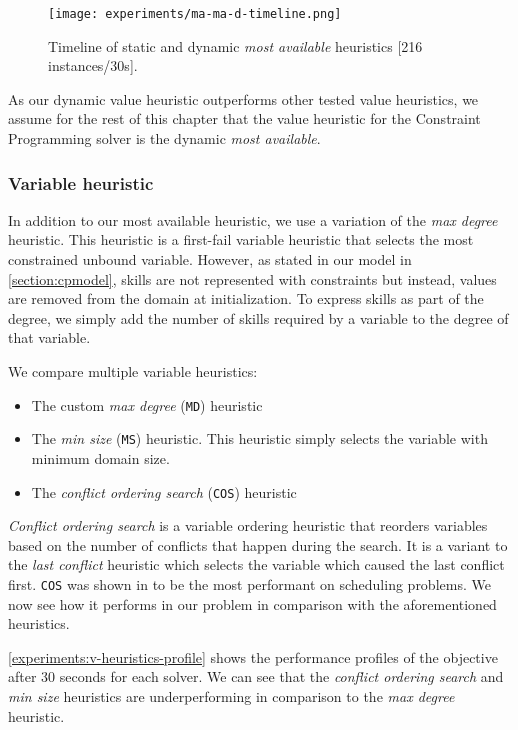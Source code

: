 \documentclass[../../thesis.tex]{subfiles}
\begin{document}
\begin{figure}
  \centering
  \texttt{[image: experiments/ma-ma-d-timeline.png]}
  \caption{Timeline of static and dynamic  \emph{most available} heuristics [216 instances/30s].}
  \label{experiments:ma-ma-d-timeline}
\end{figure}


\FloatBarrier

As our dynamic value heuristic outperforms other tested value heuristics, we assume for the rest of this chapter 
that the value heuristic for the Constraint Programming solver is the dynamic  \emph{most available}.


\subsubsection{Variable heuristic}

In addition to our most available heuristic, we use a variation of the  \emph{max degree} heuristic. 
This heuristic is a first-fail variable heuristic that selects the most constrained unbound variable. However,
as stated in our model in \autoref{section:cpmodel}, skills are not represented with constraints but instead, values 
are removed from the domain at initialization. To express skills as part of the degree, we simply add the number of 
skills required by a variable to the degree of that variable.


We compare multiple variable heuristics:

\begin{itemize}
  \item The custom  \emph{max degree} (\texttt{MD}) heuristic
  \item The \emph{min size} (\texttt{MS}) heuristic. This heuristic simply selects the variable with minimum domain size.
  \item The \emph{conflict ordering search} (\texttt{COS}) heuristic \cite{Gay:COS}
\end{itemize}


\emph{Conflict ordering search} is a variable ordering heuristic that 
reorders variables based on the number of conflicts that happen during the search.
It is a variant to the \emph{last conflict} heuristic which selects the variable which caused the last conflict first.
\texttt{COS} was shown in \cite{Gay:COS} to be the most performant on scheduling problems. 
We now see how it performs in our problem in comparison with the aforementioned heuristics.

\autoref{experiments:v-heuristics-profile} shows the performance profiles of the objective after 30 seconds for each solver.
We can see that the  \emph{conflict ordering search} and  \emph{min size} heuristics are underperforming in comparison to the  \emph{max degree} heuristic.
\end{document}
